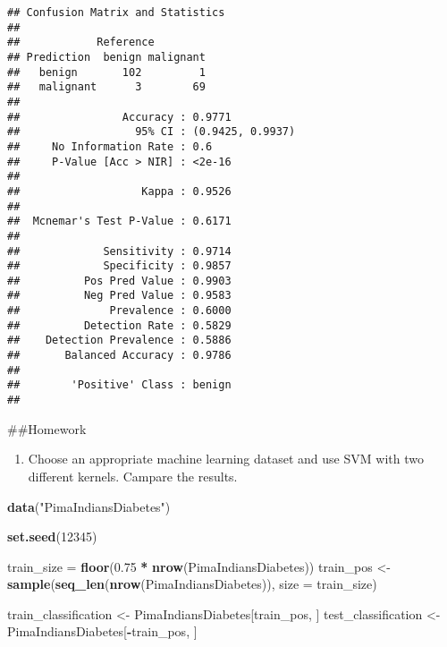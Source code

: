 \documentclass[]{article}
\newenvironment{Shaded}{\begin{snugshade}}{\end{snugshade}}
\newcommand{\DataTypeTok}[1]{\textcolor[rgb]{0.13,0.29,0.53}{#1}}
\newcommand{\DecValTok}[1]{\textcolor[rgb]{0.00,0.00,0.81}{#1}}
\newcommand{\FloatTok}[1]{\textcolor[rgb]{0.00,0.00,0.81}{#1}}
\newcommand{\KeywordTok}[1]{\textcolor[rgb]{0.13,0.29,0.53}{\textbf{#1}}}
\newcommand{\NormalTok}[1]{#1}
\newcommand{\OperatorTok}[1]{\textcolor[rgb]{0.81,0.36,0.00}{\textbf{#1}}}
\newcommand{\StringTok}[1]{\textcolor[rgb]{0.31,0.60,0.02}{#1}}
\providecommand{\tightlist}{%
  \setlength{\itemsep}{0pt}\setlength{\parskip}{0pt}}
\begin{document}
\begin{verbatim}
## Confusion Matrix and Statistics
## 
##            Reference
## Prediction  benign malignant
##   benign       102         1
##   malignant      3        69
##                                           
##                Accuracy : 0.9771          
##                  95% CI : (0.9425, 0.9937)
##     No Information Rate : 0.6             
##     P-Value [Acc > NIR] : <2e-16          
##                                           
##                   Kappa : 0.9526          
##                                           
##  Mcnemar's Test P-Value : 0.6171          
##                                           
##             Sensitivity : 0.9714          
##             Specificity : 0.9857          
##          Pos Pred Value : 0.9903          
##          Neg Pred Value : 0.9583          
##              Prevalence : 0.6000          
##          Detection Rate : 0.5829          
##    Detection Prevalence : 0.5886          
##       Balanced Accuracy : 0.9786          
##                                           
##        'Positive' Class : benign          
## 
\end{verbatim}

\#\#Homework

\begin{enumerate}
\def\labelenumi{\arabic{enumi}.}
\tightlist
\item
  Choose an appropriate machine learning dataset and use SVM with two
  different kernels. Campare the results.
\end{enumerate}

\begin{Shaded}
\begin{Highlighting}[]
\KeywordTok{data}\NormalTok{(}\StringTok{"PimaIndiansDiabetes"}\NormalTok{)}
\end{Highlighting}
\end{Shaded}

\begin{Shaded}
\begin{Highlighting}[]
\KeywordTok{set.seed}\NormalTok{(}\DecValTok{12345}\NormalTok{)}

\NormalTok{train_size =}\StringTok{ }\KeywordTok{floor}\NormalTok{(}\FloatTok{0.75} \OperatorTok{*}\StringTok{ }\KeywordTok{nrow}\NormalTok{(PimaIndiansDiabetes))}
\NormalTok{train_pos <-}\StringTok{ }\KeywordTok{sample}\NormalTok{(}\KeywordTok{seq_len}\NormalTok{(}\KeywordTok{nrow}\NormalTok{(PimaIndiansDiabetes)), }\DataTypeTok{size =}\NormalTok{ train_size)}

\NormalTok{train_classification <-}\StringTok{ }\NormalTok{PimaIndiansDiabetes[train_pos, ]}
\NormalTok{test_classification <-}\StringTok{ }\NormalTok{PimaIndiansDiabetes[}\OperatorTok{-}\NormalTok{train_pos, ]}
\end{Highlighting}
\end{Shaded}
\end{document}
